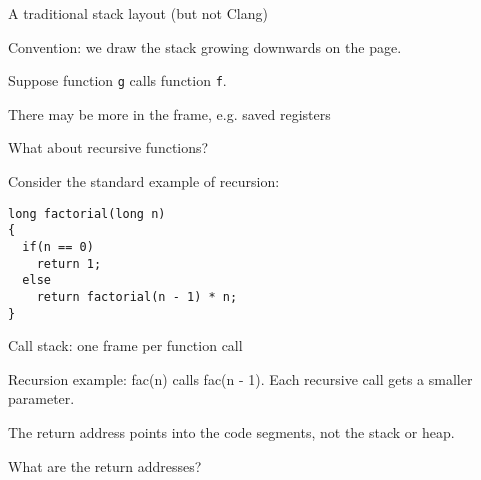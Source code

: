 \documentclass[landscape]{beamer}
\begin{document}
\begin{frame}[fragile]{A traditional stack layout (but not Clang)}


Convention: we draw the stack growing \alert{downwards} on the page. 

Suppose function \texttt g calls function \texttt f.


There may be more in the frame, e.g. saved registers  
\end{frame}   


\begin{frame}[fragile]{What about recursive functions?}

Consider the standard example of recursion:

\begin{verbatim}
long factorial(long n)
{
  if(n == 0)
    return 1;
  else
    return factorial(n - 1) * n;
}
\end{verbatim}


\end{frame}

\begin{frame}[fragile]{Call stack: one frame per function \alert{call}}

Recursion example: fac(n) calls fac(n - 1). Each recursive call gets a smaller parameter.

The return address points into the code segments, \alert{not the stack} or heap.

What are the return addresses?
\\[1em]


\end{frame}   
\end{document}
